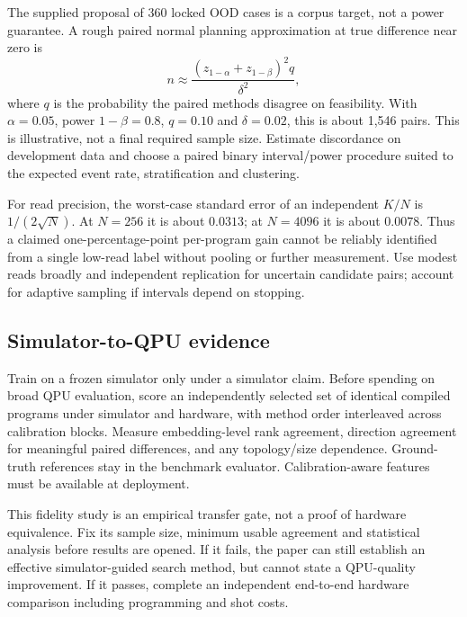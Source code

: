 \documentclass[11pt,a4paper]{article}
\theoremstyle{definition}\newtheorem{definition}[proposition]{Definition}
\begin{document}
The supplied proposal of 360 locked OOD cases is a corpus target, not a power guarantee. A rough paired normal planning approximation at true difference near zero is
\begin{equation}
n\approx\frac{(z_{1-\alpha}+z_{1-\beta})^2q}{\delta^2},
\end{equation}
where $q$ is the probability the paired methods disagree on feasibility. With $\alpha=0.05$, power $1-\beta=0.8$, $q=0.10$ and $\delta=0.02$, this is about 1,546 pairs. This is illustrative, not a final required sample size. Estimate discordance on development data and choose a paired binary interval/power procedure suited to the expected event rate, stratification and clustering.

For read precision, the worst-case standard error of an independent $K/N$ is $1/(2\sqrt N)$. At $N=256$ it is about $0.0313$; at $N=4096$ it is about $0.0078$. Thus a claimed one-percentage-point per-program gain cannot be reliably identified from a single low-read label without pooling or further measurement. Use modest reads broadly and independent replication for uncertain candidate pairs; account for adaptive sampling if intervals depend on stopping.

\subsection{Simulator-to-QPU evidence}
Train on a frozen simulator only under a simulator claim. Before spending on broad QPU evaluation, score an independently selected set of identical compiled programs under simulator and hardware, with method order interleaved across calibration blocks. Measure embedding-level rank agreement, direction agreement for meaningful paired differences, and any topology/size dependence. Ground-truth references stay in the benchmark evaluator. Calibration-aware features must be available at deployment.

This fidelity study is an empirical transfer gate, not a proof of hardware equivalence. Fix its sample size, minimum usable agreement and statistical analysis before results are opened. If it fails, the paper can still establish an effective simulator-guided search method, but cannot state a QPU-quality improvement. If it passes, complete an independent end-to-end hardware comparison including programming and shot costs.
\end{document}
